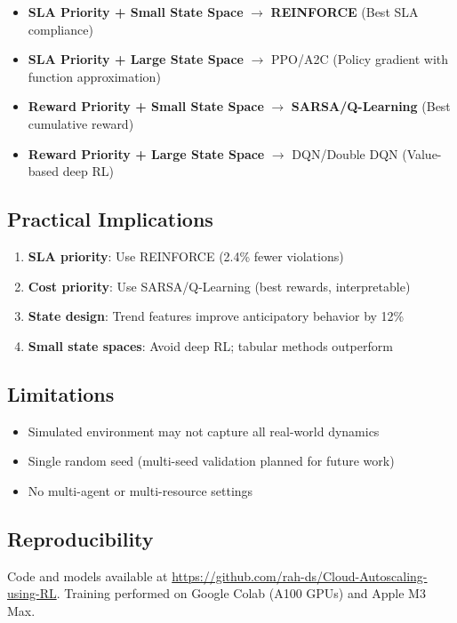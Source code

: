 \documentclass[conference]{IEEEtran}
\begin{document}
\begin{itemize}
    \item \textbf{SLA Priority + Small State Space} $\rightarrow$ \textbf{REINFORCE} (Best SLA compliance)
    \item \textbf{SLA Priority + Large State Space} $\rightarrow$ PPO/A2C (Policy gradient with function approximation)
    \item \textbf{Reward Priority + Small State Space} $\rightarrow$ \textbf{SARSA/Q-Learning} (Best cumulative reward)
    \item \textbf{Reward Priority + Large State Space} $\rightarrow$ DQN/Double DQN (Value-based deep RL)
\end{itemize}

\subsection{Practical Implications}
\begin{enumerate}
    \item \textbf{SLA priority}: Use REINFORCE (2.4\% fewer violations)
    \item \textbf{Cost priority}: Use SARSA/Q-Learning (best rewards, interpretable)
    \item \textbf{State design}: Trend features improve anticipatory behavior by 12\%
    \item \textbf{Small state spaces}: Avoid deep RL; tabular methods outperform
\end{enumerate}

\subsection{Limitations}
\begin{itemize}
    \item Simulated environment may not capture all real-world dynamics
    \item Single random seed (multi-seed validation planned for future work)
    \item No multi-agent or multi-resource settings
\end{itemize}

\subsection{Reproducibility}
Code and models available at \url{https://github.com/rah-ds/Cloud-Autoscaling-using-RL}. Training performed on Google Colab (A100 GPUs) and Apple M3 Max.
\end{document}
